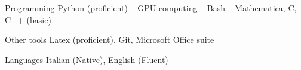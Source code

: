 


\begin{cvskills}


\cvskill
{Programming} %
{Python (proficient) -- GPU computing -- Bash -- Mathematica, C, C++ (basic)} %


\cvskill
{Other tools} %
{Latex (proficient), Git, Microsoft Office suite} %


\cvskill
{Languages} %
{Italian (Native), English (Fluent)} %


\end{cvskills}